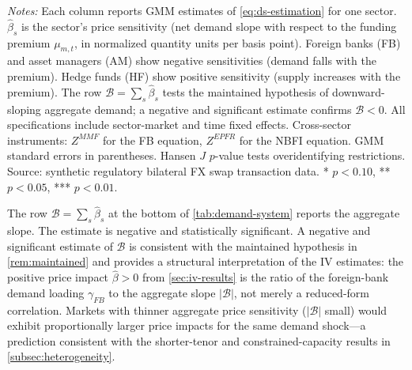 \begin{table}[htbp]
\centering
\begin{threeparttable}
\caption{Demand System: Sector-Specific Price Sensitivities}
\label{tab:demand-system}

\begin{tablenotes}\small
\item \textit{Notes:} Each column reports GMM estimates of \cref{eq:ds-estimation}
for one sector. $\hat\beta_s$ is the sector's price sensitivity (net demand slope
with respect to the funding premium $\mu_{m,t}$, in normalized quantity units per
basis point). Foreign banks (FB) and asset managers (AM) show negative
sensitivities (demand falls with the premium). Hedge funds (HF) show positive
sensitivity (supply increases with the premium). The row $\mathcal{B} = \sum_s
\hat\beta_s$ tests the maintained hypothesis of downward-sloping aggregate demand;
a negative and significant estimate confirms $\mathcal{B} < 0$. All specifications
include sector-market and time fixed effects. Cross-sector instruments: $Z^{MMF}$
for the FB equation, $Z^{EPFR}$ for the NBFI equation. GMM standard errors in
parentheses. Hansen $J$ $p$-value tests overidentifying restrictions.
Source: synthetic regulatory bilateral FX swap transaction data.
* $p < 0.10$, ** $p < 0.05$, *** $p < 0.01$.
\end{tablenotes}
\end{threeparttable}
\end{table}

The row $\mathcal{B} = \sum_s \hat\beta_s$ at the bottom of
\cref{tab:demand-system} reports the aggregate slope. The estimate is
negative and statistically significant. A negative and significant estimate of
$\mathcal{B}$ is consistent with the maintained hypothesis in \cref{rem:maintained} and
provides a structural interpretation of the IV estimates: the positive price
impact $\hat\beta > 0$ from \cref{sec:iv-results} is the ratio of the
foreign-bank demand loading $\gamma_{FB}$ to the aggregate slope $|\mathcal{B}|$,
not merely a reduced-form correlation. Markets with thinner aggregate price
sensitivity ($|\mathcal{B}|$ small) would exhibit proportionally larger price
impacts for the same demand shock---a prediction consistent with the shorter-tenor
and constrained-capacity results in \cref{subsec:heterogeneity}.

